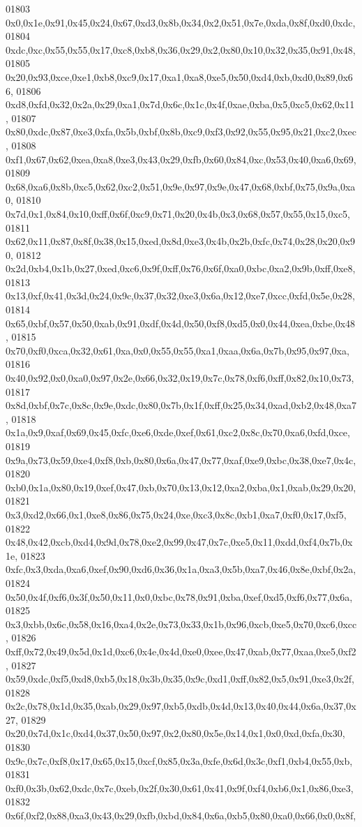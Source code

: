 \begin{DoxyCode}
01803   0x0,0x1e,0x91,0x45,0x24,0x67,0xd3,0x8b,0x34,0x2,0x51,0x7e,0xda,0x8f,0xd0,0xdc,
01804   0xdc,0xc,0x55,0x55,0x17,0xc8,0xb8,0x36,0x29,0x2,0x80,0x10,0x32,0x35,0x91,0x48,
01805   0x20,0x93,0xce,0xe1,0xb8,0xc9,0x17,0xa1,0xa8,0xe5,0x50,0xd4,0xb,0xd0,0x89,0x66,
01806   0xd8,0xfd,0x32,0x2a,0x29,0xa1,0x7d,0x6c,0x1c,0x4f,0xae,0xba,0x5,0xc5,0x62,0x11,
01807   0x80,0xdc,0x87,0xe3,0xfa,0x5b,0xbf,0x8b,0xc9,0xf3,0x92,0x55,0x95,0x21,0xc2,0xec,
01808   0xf1,0x67,0x62,0xea,0xa8,0xe3,0x43,0x29,0xfb,0x60,0x84,0xc,0x53,0x40,0xa6,0x69,
01809   0x68,0xa6,0x8b,0xc5,0x62,0xc2,0x51,0x9e,0x97,0x9e,0x47,0x68,0xbf,0x75,0x9a,0xa0,
01810   0x7d,0x1,0x84,0x10,0xff,0x6f,0xc9,0x71,0x20,0x4b,0x3,0x68,0x57,0x55,0x15,0xc5,
01811   0x62,0x11,0x87,0x8f,0x38,0x15,0xed,0x8d,0xe3,0x4b,0x2b,0xfc,0x74,0x28,0x20,0x90,
01812   0x2d,0xb4,0x1b,0x27,0xed,0xc6,0x9f,0xff,0x76,0x6f,0xa0,0xbc,0xa2,0x9b,0xff,0xe8,
01813   0x13,0xf,0x41,0x3d,0x24,0x9c,0x37,0x32,0xe3,0x6a,0x12,0xe7,0xcc,0xfd,0x5e,0x28,
01814   0x65,0xbf,0x57,0x50,0xab,0x91,0xdf,0x4d,0x50,0xf8,0xd5,0x0,0x44,0xea,0xbe,0x48,
01815   0x70,0xf0,0xca,0x32,0x61,0xa,0x0,0x55,0x55,0xa1,0xaa,0x6a,0x7b,0x95,0x97,0xa,
01816   0x40,0x92,0x0,0xa0,0x97,0x2e,0x66,0x32,0x19,0x7c,0x78,0xf6,0xff,0x82,0x10,0x73,
01817   0x8d,0xbf,0x7c,0x8c,0x9e,0xdc,0x80,0x7b,0x1f,0xff,0x25,0x34,0xad,0xb2,0x48,0xa7,
01818   0x1a,0x9,0xaf,0x69,0x45,0xfc,0xe6,0xde,0xef,0x61,0xc2,0x8c,0x70,0xa6,0xfd,0xce,
01819   0x9a,0x73,0x59,0xe4,0xf8,0xb,0x80,0x6a,0x47,0x77,0xaf,0xe9,0xbc,0x38,0xe7,0x4c,
01820   0xb0,0x1a,0x80,0x19,0xef,0x47,0xb,0x70,0x13,0x12,0xa2,0xba,0x1,0xab,0x29,0x20,
01821   0x3,0xd2,0x66,0x1,0xe8,0x86,0x75,0x24,0xe,0xc3,0x8c,0xb1,0xa7,0xf0,0x17,0xf5,
01822   0x48,0x42,0xcb,0xd4,0x9d,0x78,0xe2,0x99,0x47,0x7c,0xe5,0x11,0xdd,0xf4,0x7b,0x1e,
01823   0xfc,0x3,0xda,0xa6,0xef,0x90,0xd6,0x36,0x1a,0xa3,0x5b,0xa7,0x46,0x8e,0xbf,0x2a,
01824   0x50,0x4f,0xf6,0x3f,0x50,0x11,0x0,0xbc,0x78,0x91,0xba,0xef,0xd5,0xf6,0x77,0x6a,
01825   0x3,0xbb,0x6c,0x58,0x16,0xa4,0x2e,0x73,0x33,0x1b,0x96,0xcb,0xe5,0x70,0xc6,0xcc,
01826   0xff,0x72,0x49,0x5d,0x1d,0xc6,0x4e,0x4d,0xe0,0xee,0x47,0xab,0x77,0xaa,0xe5,0xf2,
01827   0x59,0xdc,0xf5,0xd8,0xb5,0x18,0x3b,0x35,0x9c,0xd1,0xff,0x82,0x5,0x91,0xe3,0x2f,
01828   0x2c,0x78,0x1d,0x35,0xab,0x29,0x97,0xb5,0xdb,0x4d,0x13,0x40,0x44,0x6a,0x37,0x27,
01829   0x20,0x7d,0x1c,0xd4,0x37,0x50,0x97,0x2,0x80,0x5e,0x14,0x1,0x0,0xd,0xfa,0x30,
01830   0x9c,0x7c,0xf8,0x17,0x65,0x15,0xcf,0x85,0x3a,0xfe,0x6d,0x3c,0xf1,0xb4,0x55,0xb,
01831   0xf0,0x3b,0x62,0xdc,0x7c,0xeb,0x2f,0x30,0x61,0x41,0x9f,0xf4,0xb6,0x1,0x86,0xe3,
01832   0x6f,0xf2,0x88,0xa3,0x43,0x29,0xfb,0xbd,0x84,0x6a,0xb5,0x80,0xa0,0x66,0x0,0x8f,

\end{DoxyCode}
